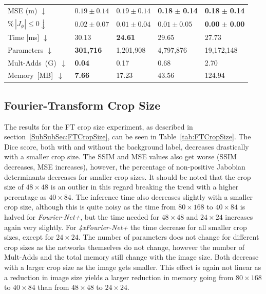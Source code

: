\begin{table}[h]
\begin{tabularx}{\textwidth}{Y Y Y Y Y}
		MSE (m) $\downarrow$ & $0.19 \pm 0.14$ & $0.19 \pm 0.14$ & \textbf{0.18} $\pm$ \textbf{0.14} & \textbf{0.18} $\pm$ \textbf{0.14} \\
		$\% \, |J_{\phi}|\leq0 \downarrow$ & $0.02 \pm 0.07$ & $0.01 \pm 0.04$ & $0.01 \pm 0.05$ & \textbf{0.00} $\pm$ \textbf{0.00} \\
		Time [ms] $\downarrow$ 	  & 30.13 	& \textbf{24.61} 	& 29.65 	& 27.73 \\
		Parameters $\downarrow$ 	  & \textbf{301,716} 	& 1,201,908 	& 4,797,876 	& 19,172,148 \\
		\mbox{Mult-Adds (G) $\downarrow$} & \textbf{0.04} 	& 0.17 		& 0.68 		& 2.70 \\
		\mbox{Memory [MB]  $\downarrow$}	  & \textbf{7.66} 	& 17.23 		& 43.56 		& 124.94 \\
		\bottomrule
	\end{tabularx}
\end{table}


\subsection{Fourier-Transform Crop Size} \label{SubSec:ResultsFTCropSize}
The results for the FT crop size experiment, as described in section~\ref{SubSubSec:FTCropSize}, can be seen in Table~\ref{tab:FTCropSize}. The Dice score, both with and without the background label, decreases drastically with a smaller crop size. The SSIM and MSE values also get worse (SSIM decreases, MSE increases), however, the percentage of non-positive Jabobian determinants decreases for smaller crop sizes. It should be noted that the crop size of $48 \times 48$ is an outlier in this regard breaking the trend with a higher percentage as $40 \times 84$. The inference time also decreases slightly with a smaller crop size, although this is quite noisy as the time from $80 \times 168$ to $40 \times 84$ is halved for \emph{Fourier-Net+}, but the time needed for $48 \times 48$ and $24 \times 24$ increases again very slightly. For \emph{4xFourier-Net+} the time decrease for all smaller crop sizes, except for $24 \times 24$. The number of parameters does not change for different crop sizes as the networks themselves do not change, however the number of Mult-Adds and the total memory still change with the image size. Both decrease with a larger crop size as the image gets smaller. This effect is again not linear as a reduction in image size yields a larger reduction in memory going from $80 \times 168$ to $40 \times 84$ than from $48 \times 48$ to $24 \times 24$. 

